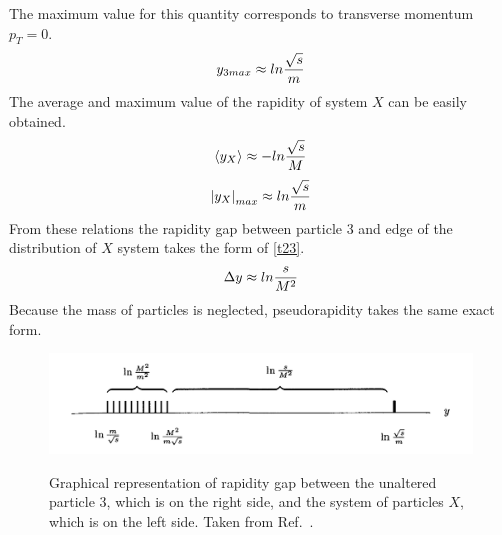 The maximum value for this quantity corresponds to transverse momentum $p_{T}=0$.
\begin{equation}
\centering
y_{3max} \approx ln \frac{\sqrt{s}}{m}
\label{t20}
\end{equation}
The average and maximum value of the rapidity of system $X$ can be easily obtained.
\begin{equation}
\centering
\left<y_X\right> \approx -ln \frac{\sqrt{s}}{M}
\label{t21}
\end{equation}
\begin{equation}
\centering
\left|y_{X}\right|_{max} \approx ln \frac{\sqrt{s}}{m}
\label{t22}
\end{equation}
From these relations the rapidity gap between particle 3 and edge of the distribution of $X$ system takes the form of \autoref{t23}.
\begin{equation}
\centering
\Delta y \approx ln \frac{s}{M^2}
\label{t23}
\end{equation}
Because the mass of particles is neglected, pseudorapidity takes the same exact form.
\FloatBarrier
\begin{figure}[ht]
\centering
\includegraphics[width=1\textwidth]{figures/rapiditygap.jpg}
\label{tf1}
\caption[Large rapidity gap]{Graphical representation of rapidity gap between the unaltered particle 3, which is on the right side, and the system of particles $X$, which is on the left side. Taken from Ref.~\cite{Barone}.}
\end{figure}
\FloatBarrier


